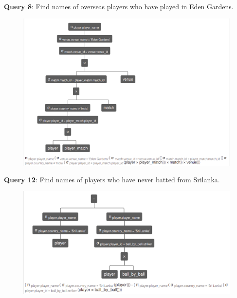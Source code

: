 \documentclass[12pt, fleqn]{article}
\begin{document}
\newpage
\textbf{Query 8}: Find names of overseas players who have played in Eden Gardens. \\
\begin{figure}[H]
  \centering
  \includegraphics[scale=0.4]{ra/ra08.png}
\end{figure}

\newpage
\textbf{Query 12}: Find names of players who have never batted from Srilanka. \\
\begin{figure}[H]
  \centering
  \includegraphics[scale=0.42]{ra/ra12.png}
\end{figure}
\end{document}
